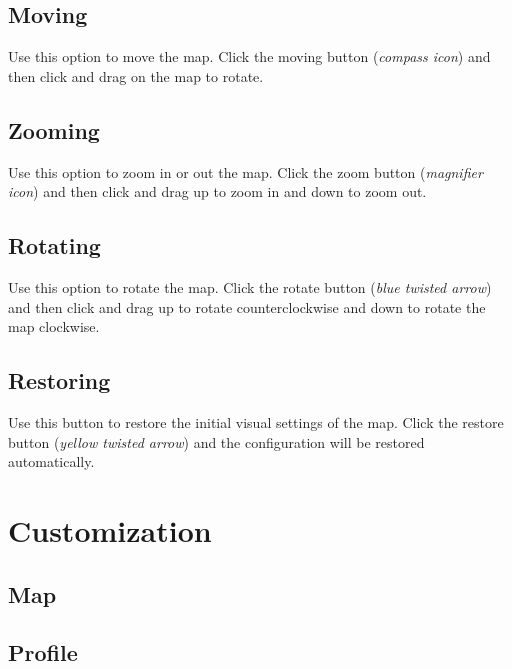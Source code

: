 \documentclass[12pt,a4paper]{article}
\begin{document}
\subsection{Moving}
Use this option to move the map. Click the moving button ({\it compass icon}) and then click and drag on the map to rotate.

\subsection{Zooming}
Use this option to zoom in or out the map. Click the zoom button ({\it magnifier icon}) and then click and drag up to zoom in and down to zoom out.

\subsection{Rotating}
Use this option to rotate the map. Click the rotate button ({\it blue twisted arrow}) and then click and drag up to rotate counterclockwise and down to rotate the map clockwise.

\subsection{Restoring}
Use this button to restore the initial visual settings of the map. Click the restore button ({\it yellow twisted arrow}) and the configuration will be restored automatically.


\section{Customization}
\subsection{Map}
\subsection{Profile}
\end{document}
